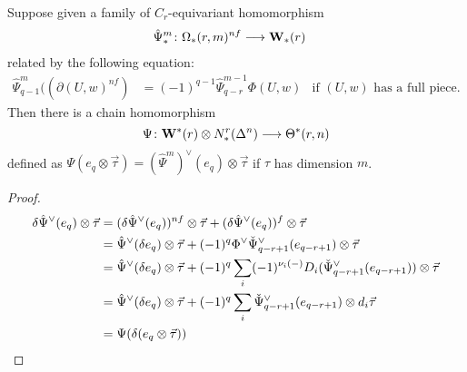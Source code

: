 \begin{lemma} \label{lemma:omegarm}
	Suppose given a family of $C_r$-equivariant homomorphism
	\begin{align*}
		\hat{\Psi}_*^m\colon \Omega_*(r,m)^{nf}&\longrightarrow \mathbf{W}_*(r)
	\end{align*}
	related by the following equation:
	\begin{align}\label{it:1a}
		\hat{\Psi}^m_{q-1}((\partial (U,w)^{nf}) &= (-1)^{q-1}\hat{\Psi}^{m-1}_{q-r}\Phi(U,w) &\text{if $(U,w)$ has a full piece.}
	\end{align}
	Then there is a chain homomorphism
	\[\Psi\colon \mathbf{W}^*(r)\otimes N^r_*(\Delta^n)\longrightarrow \Theta^*(r,n)\]
	defined as $\Psi(e_q\otimes \vec{\tau}) = (\hat{\Psi}^m)^\vee(e_q)\otimes \vec{\tau}$ if $\tau$ has dimension $m$.
\end{lemma}

\begin{proof}
	\begin{align*}
		\delta\hat{\Psi}^{\vee}(e_q)\otimes \vec{\tau}
		&= (\delta\hat{\Psi}^{\vee}(e_q))^{nf}\otimes\vec{\tau} + (\delta\hat{\Psi}^{\vee}(e_q))^f\otimes\vec{\tau} \\
		&= \hat{\Psi}^{\vee}(\delta e_q)\otimes \vec{\tau} +(-1)^q \Phi^\vee\check{\Psi}^\vee_{q-r+1}(e_{q-r+1})\otimes\vec{\tau} \\
		&= \hat{\Psi}^{\vee}(\delta e_{q})\otimes \vec{\tau} + (-1)^q \sum_i (-1)^{\nu_i(-)} D_i(\check{\Psi}^\vee_{q-r+1}(e_{q-r+1}))\otimes \vec{\tau}\\
		&= \hat{\Psi}^{\vee}(\delta e_q)\otimes \vec{\tau} + (-1)^q \sum_i \check{\Psi}^\vee_{q-r+1}(e_{q-r+1})\otimes d_i\vec{\tau} \\
		&= \Psi(\delta(e_q\otimes \vec{\tau}))\qedhere
	\end{align*}
\end{proof}

